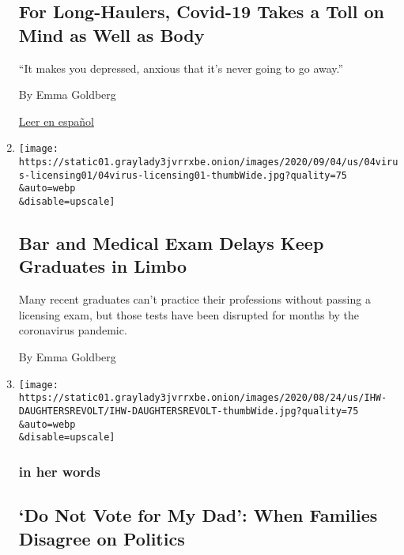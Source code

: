 \begin{enumerate}
  \hypertarget{for-long-haulers-covid-19-takes-a-toll-on-mind-as-well-as-body}{%
  \subsection{For Long-Haulers, Covid-19 Takes a Toll on Mind as Well as
  Body}\label{for-long-haulers-covid-19-takes-a-toll-on-mind-as-well-as-body}}

  ``It makes you depressed, anxious that it's never going to go away.''

  By Emma Goldberg

  \href{https://www.nytimes3xbfgragh.onion/es/2020/09/09/espanol/ciencia-y-tecnologia/salud-mental-coronavirus.html}{Leer
  en español}
\item
  \href{/2020/09/04/us/bar-exam-coronavirus.html}{}

  \texttt{[image: https://static01.graylady3jvrrxbe.onion/images/2020/09/04/us/04virus-licensing01/04virus-licensing01-thumbWide.jpg?quality=75\\\&auto=webp\\\&disable=upscale]}

  \hypertarget{bar-and-medical-exam-delays-keep-graduates-in-limbo}{%
  \subsection{Bar and Medical Exam Delays Keep Graduates in
  Limbo}\label{bar-and-medical-exam-delays-keep-graduates-in-limbo}}

  Many recent graduates can't practice their professions without passing
  a licensing exam, but those tests have been disrupted for months by
  the coronavirus pandemic.

  By Emma Goldberg
\item
  \href{/2020/08/27/us/family-politics-children-democrat-republican.html}{}

  \texttt{[image: https://static01.graylady3jvrrxbe.onion/images/2020/08/24/us/IHW-DAUGHTERSREVOLT/IHW-DAUGHTERSREVOLT-thumbWide.jpg?quality=75\\\&auto=webp\\\&disable=upscale]}

  \hypertarget{in-her-words}{%
  \subsubsection{in her words}\label{in-her-words}}

  \hypertarget{do-not-vote-for-my-dad-when-families-disagree-on-politics}{%
  \subsection{`Do Not Vote for My Dad': When Families Disagree on
  Politics}\label{do-not-vote-for-my-dad-when-families-disagree-on-politics}}


\end{enumerate}
